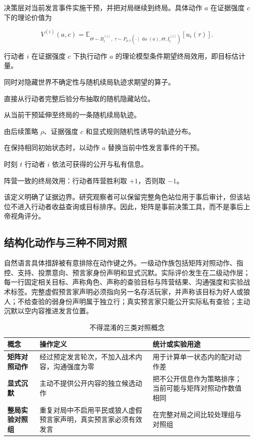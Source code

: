 \documentclass[UTF8,11pt,a4paper,fontset=windows]{ctexart}
\begin{document}
决策层对当前发言事件实施干预，并把对局继续到终局。具体动作 $a$ 在证据强度 $c$ 下的理论价值为

\[
V^{(i)}(a,c)=
\mathbb{E}_{\Theta\sim B_t^{(i)},\;
\tau\sim P_{\rho,c}(\cdot\mid \operatorname{do}(a),\Theta,I_t^{(i)})}
\left[u_i(\tau)\right].
\]

\begin{description}[style=nextline,leftmargin=3.4cm,labelwidth=3.0cm]
  \item[$V^{(i)}(a,c)$] 行动者 $i$ 在证据强度 $c$ 下执行动作 $a$ 的理论模型条件期望终局效用，即目标估计量。
  \item[$\mathbb{E}$] 同时对隐藏世界不确定性与随机续局轨迹求期望的算子。
  \item[$\Theta$] 直接从行动者完整后验分布抽取的随机隐藏站位。
  \item[$\tau$] 从当前干预延伸至终局的一条随机续局轨迹。
  \item[$P_{\rho,c}$] 由后续策略 $\rho$、证据强度 $c$ 和显式规则随机性诱导的轨迹分布。
  \item[$\operatorname{do}(a)$] 在保持相同初始状态时，以动作 $a$ 替换当前中性发言事件的干预。
  \item[$I_t^{(i)}$] 时刻 $t$ 行动者 $i$ 依法可获得的公开与私有信息。
  \item[$u_i(\tau)$] 阵营一致的终局效用：行动者阵营胜利取 $+1$，否则取 $-1$。
\end{description}

该定义明确了证据边界。研究观察者可以保留完整角色站位用于事后审计，但该站位不进入行动者收益查询或目标排序。因此，矩阵是事前决策工具，而不是事后上帝视角评分。

\subsection{结构化动作与三种不同对照}

自然语言具体措辞被有意排除在动作键之外。一级动作族包括矩阵对照动作、指控、支持、投票意向、预言家身份声明和显式沉默。实际评价发生在二级动作层；每一行固定相关目标、声称角色、声称的查验目标与阵营结果、沟通强度和实验战术标签。完整虚假预言家声明必须指向另一名存活玩家，并声称该目标为好人或狼人；不给查验的弱身份声明属于独立行；真实预言家只能公开实际私有查验；主动沉默以空内容推进发言位置。

\begin{table}[htbp]
\centering
\caption{不得混淆的三类对照概念}
\begin{tabularx}{\textwidth}{>{\bfseries}p{}YY}
\toprule
概念 & 操作定义 & 统计或实验用途 \\
\midrule
矩阵对照动作 & 经过预定发言轮次，不加入战术内容，沟通强度为零 & 用于计算单一状态内的配对动作差 \\
显式沉默 & 主动不提供公开内容的独立候选动作 & 把不公开信息作为策略排序；当前可能与矩阵对照动作数值相同 \\
整局实验对照组 & 重复对局中不启用平民或狼人虚假预言家声明，真实预言家必须有效发言 & 在完整对局之间比较处理组与对照组 \\
\bottomrule
\end{tabularx}
\end{table}
\end{document}

